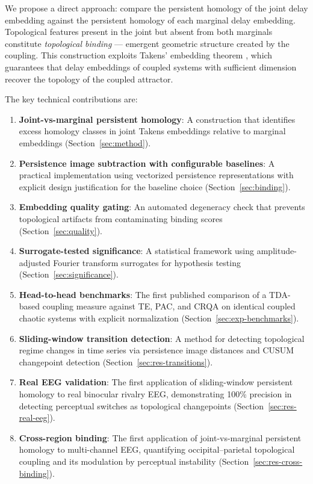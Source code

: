 \documentclass[11pt,a4paper]{article}
\begin{document}
We propose a direct approach: compare the persistent homology of the joint delay embedding against the persistent homology of each marginal delay embedding.
Topological features present in the joint but absent from both marginals constitute \emph{topological binding} --- emergent geometric structure created by the coupling.
This construction exploits Takens' embedding theorem \citep{takens1981detecting, sauer1991embedology}, which guarantees that delay embeddings of coupled systems with sufficient dimension recover the topology of the coupled attractor.

The key technical contributions are:
\begin{enumerate}
    \item \textbf{Joint-vs-marginal persistent homology}: A construction that identifies excess homology classes in joint Takens embeddings relative to marginal embeddings (Section~\ref{sec:method}).
    \item \textbf{Persistence image subtraction with configurable baselines}: A practical implementation using vectorized persistence representations with explicit design justification for the baseline choice (Section~\ref{sec:binding}).
    \item \textbf{Embedding quality gating}: An automated degeneracy check that prevents topological artifacts from contaminating binding scores (Section~\ref{sec:quality}).
    \item \textbf{Surrogate-tested significance}: A statistical framework using amplitude-adjusted Fourier transform surrogates for hypothesis testing (Section~\ref{sec:significance}).
    \item \textbf{Head-to-head benchmarks}: The first published comparison of a TDA-based coupling measure against TE, PAC, and CRQA on identical coupled chaotic systems with explicit normalization (Section~\ref{sec:exp-benchmarks}).
    \item \textbf{Sliding-window transition detection}: A method for detecting topological regime changes in time series via persistence image distances and CUSUM changepoint detection (Section~\ref{sec:res-transitions}).
    \item \textbf{Real EEG validation}: The first application of sliding-window persistent homology to real binocular rivalry EEG, demonstrating 100\% precision in detecting perceptual switches as topological changepoints (Section~\ref{sec:res-real-eeg}).
    \item \textbf{Cross-region binding}: The first application of joint-vs-marginal persistent homology to multi-channel EEG, quantifying occipital--parietal topological coupling and its modulation by perceptual instability (Section~\ref{sec:res-cross-binding}).

\end{enumerate}
\end{document}
